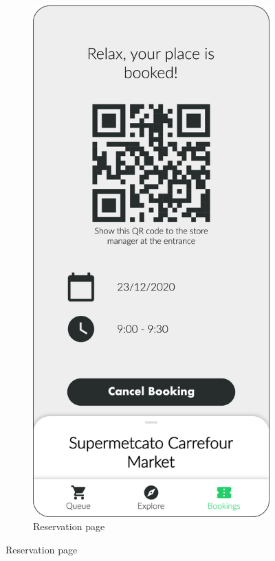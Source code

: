 \begin{figure}[H]
\begin{subfigure}[t]{0.28\textwidth}
    \end{subfigure}
    \quad
    \begin{subfigure}[t]{0.28\textwidth} 
        \includegraphics{../mockups/reservation}
        \caption*{Reservation page}
    \end{subfigure}
\end{figure}


